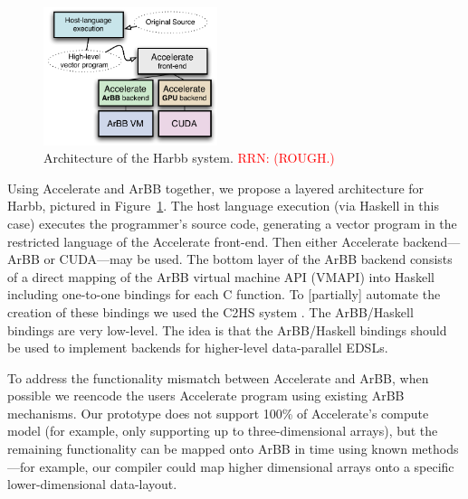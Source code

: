 \documentclass[conference]{IEEEtran}
\newcommand{\textred}[1]{\textcolor{red}{#1}}
\newcommand{\pgwrapper}[2]{\textred{#1: #2}}
\newcommand{\rnote}[1]{\begin{itemize}\item{\textcolor{blue}{#1}}\end{itemize}}
\newcommand{\textred}[1]{#1}
\newcommand{\pgwrapper}[2]{}
\newcommand{\rnote}[1]{}
\newcommand{\js}[1]{\pgwrapper{BJS}{#1}}
\newcommand{\rn}[1]{\pgwrapper{RRN}{#1}}
\newcommand{\systemname}[0]{{Harbb}}
\newcommand{\arbbvmH}[0]{ArBB/Haskell}
\begin{document}

\begin{figure}
  \begin{center}
   \includegraphics[width=2.0in]{figure_architecture}    
  \end{center}
\vspace{-5mm}
  \caption{Architecture of the \systemname{} system.  \rn{(ROUGH.)}}
  \label{f:architecture}
\end{figure}


Using Accelerate and ArBB together, we propose a layered architecture
for \systemname{},
pictured in Figure~\ref{f:architecture}. 
The host language execution (via Haskell in this case) executes the
programmer's source code, generating a vector program in the
restricted language of the Accelerate front-end.
Then either Accelerate backend---ArBB or CUDA---may be used.
The 
bottom layer of the ArBB backend consists of a direct mapping of the ArBB virtual machine
API (VMAPI) into Haskell including one-to-one bindings for each C 
function. 
To [partially] automate the creation of these bindings we used the C2HS system \cite{C2HS}. The 
\arbbvmH{} bindings are very low-level.
The idea 
is that the \arbbvmH{} bindings should be used to implement
backends for higher-level data-parallel EDSLs.


To address the functionality mismatch between Accelerate and ArBB,
when possible we reencode the users Accelerate program using existing
ArBB mechanisms.  Our prototype does not support 100\% of Accelerate's
compute model (for example, only supporting  up to three-dimensional
arrays), but the remaining functionality can be mapped onto ArBB in
time using known methods---for example, our compiler could map higher
dimensional arrays onto a specific lower-dimensional data-layout.
\end{document}
